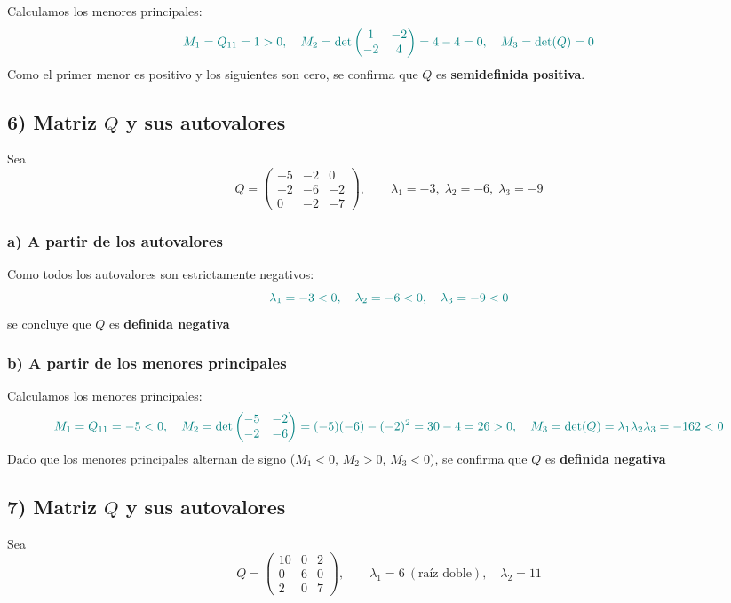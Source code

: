 \documentclass{article}
\begin{document}
Calculamos los menores principales:
\[
\color{teal}
M_1 = Q_{11} = 1 > 0,
\quad
M_2 = \det\begin{pmatrix}1 & -2\\-2 & 4\end{pmatrix} = 4 - 4 = 0,
\quad
M_3 = \det(Q) = 0
\]
Como el primer menor es positivo y los siguientes son cero, se confirma que \(Q\) es \textbf{semidefinida positiva}.
\subsection*{6) Matriz \(Q\) y sus autovalores}

Sea
\[
Q =
\begin{pmatrix}
-5 & -2 & 0\\[4pt]
-2 & -6 & -2\\[4pt]
0  & -2 & -7
\end{pmatrix},
\qquad
\lambda_1 = -3,\;\lambda_2 = -6,\;\lambda_3 = -9
\]

\subsubsection*{a) A partir de los autovalores}

Como todos los autovalores son estrictamente negativos:
\[
\color{teal}
\lambda_1 = -3 < 0,\quad \lambda_2 = -6 < 0,\quad \lambda_3 = -9 < 0
\]
se concluye que \(Q\) es \textbf{definida negativa}

\subsubsection*{b) A partir de los menores principales}

Calculamos los menores principales:
\[
\color{teal}
M_1 = Q_{11} = -5 < 0,
\quad
M_2 = \det\begin{pmatrix}-5 & -2\\-2 & -6\end{pmatrix} = (-5)(-6)-(-2)^2 = 30-4 = 26 > 0,
\quad
M_3 = \det(Q) = \lambda_1\lambda_2\lambda_3 = -162 < 0
\]
Dado que los menores principales alternan de signo (\(M_1<0\), \(M_2>0\), \(M_3<0\)), se confirma que \(Q\) es \textbf{definida negativa}
\subsection*{7) Matriz \(Q\) y sus autovalores}

Sea
\[
Q =
\begin{pmatrix}
10 & 0 & 2\\[4pt]
0  & 6 & 0\\[4pt]
2  & 0 & 7
\end{pmatrix},
\qquad
\lambda_1 = 6\ (\text{raíz doble}),\quad \lambda_2 = 11
\]
\end{document}
